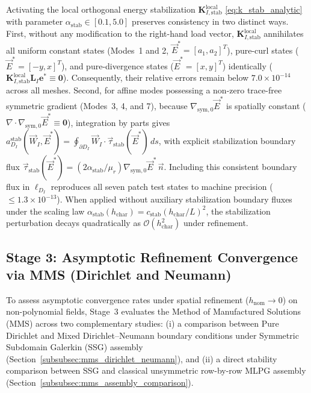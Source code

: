 \documentclass[VANCOUVER,Times1COL]{WileyNJD-v5}
\begin{document}
\begin{remark}
\label{rem:patch_test_stab}
    Activating the local orthogonal energy stabilization $\mathbf{K}_{I,\mathrm{stab}}^{\mathrm{local}}$ \eqref{eq:k_stab_analytic} with parameter $\alpha_{\mathrm{stab}} \in [0.1, 5.0]$ preserves consistency in two distinct ways. First, without any modification to the right-hand load vector, $\mathbf{K}_{I, \mathrm{stab}}^{\mathrm{local}}$ annihilates all uniform constant states (Modes~1 and 2, $\vec{E}^* = [a_1, a_2]^T$), pure-curl states ($\vec{E}^* = [-y, x]^T$), and pure-divergence states ($\vec{E}^* = [x, y]^T$) identically ($\mathbf{K}_{I, \mathrm{stab}}^{\mathrm{local}} \mathbf{L}_I \mathbf{e}^* \equiv \mathbf{0}$). Consequently, their relative errors remain below $7.0 \times 10^{-14}$ across all meshes. Second, for affine modes possessing a non-zero trace-free symmetric gradient (Modes~3, 4, and 7), because $\nabla_{\mathrm{sym},0}\vec{E}^*$ is spatially constant ($\nabla \cdot \nabla_{\mathrm{sym},0}\vec{E}^* \equiv \mathbf{0}$), integration by parts gives $a_{D_I}^{\mathrm{stab}}(\vec{W}_I, \vec{E}^*) = \oint_{\partial D_I} \vec{W}_I \cdot \vec{\tau}_{\mathrm{stab}}(\vec{E}^*) \, ds$, with explicit stabilization boundary flux $\vec{\tau}_{\mathrm{stab}}(\vec{E}^*) = (2\alpha_{\mathrm{stab}}/\mu_r)\nabla_{\mathrm{sym},0}\vec{E}^*\,\vec{n}$. Including this consistent boundary flux in $\ell_{D_I}$ reproduces all seven patch test states to machine precision ($\le 1.3 \times 10^{-13}$). When applied without auxiliary stabilization boundary fluxes under the scaling law $\alpha_{\mathrm{stab}}(h_{\mathrm{char}}) = c_{\mathrm{stab}}(h_{\mathrm{char}}/L)^2$, the stabilization perturbation decays quadratically as $\mathcal{O}(h_{\mathrm{char}}^2)$ under refinement.
\end{remark}

\subsection{Stage 3: Asymptotic Refinement Convergence via MMS (Dirichlet and Neumann)}
\label{subsec:stage3_mms}

To assess asymptotic convergence rates under spatial refinement ($h_{\mathrm{nom}} \to 0$) on non-polynomial fields, Stage~3 evaluates the Method of Manufactured Solutions (MMS) across two complementary studies: (i) a comparison between Pure Dirichlet and Mixed Dirichlet--Neumann boundary conditions under Symmetric Subdomain Galerkin (SSG) assembly (Section~\ref{subsubsec:mms_dirichlet_neumann}), and (ii) a direct stability comparison between SSG and classical unsymmetric row-by-row MLPG assembly (Section~\ref{subsubsec:mms_assembly_comparison}).
\end{document}
